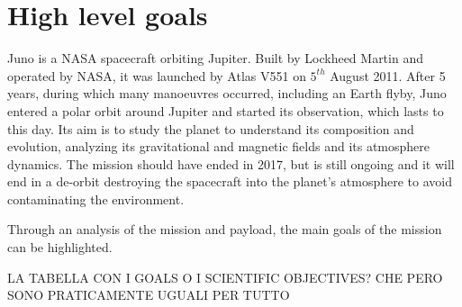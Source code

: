 \section{High level goals}
\label{sec:goals}

Juno is a NASA spacecraft orbiting Jupiter. Built by Lockheed Martin and operated by NASA, it was launched by Atlas V551 on $5^{th}$ August 2011. After 5 years, during which many manoeuvres occurred, including an Earth flyby, Juno entered a polar orbit around Jupiter and started its observation, which lasts to this day. Its aim is to study the planet to understand its composition and evolution, analyzing its gravitational and magnetic fields and its atmosphere dynamics. The mission should have ended in 2017, but is still ongoing and it will end in a de-orbit destroying the spacecraft into the planet's atmosphere to avoid contaminating the environment. 


Through an analysis of the mission and payload, the main goals of the mission can be highlighted.


LA TABELLA CON I GOALS O I SCIENTIFIC OBJECTIVES? CHE PERO SONO PRATICAMENTE UGUALI PER TUTTO


